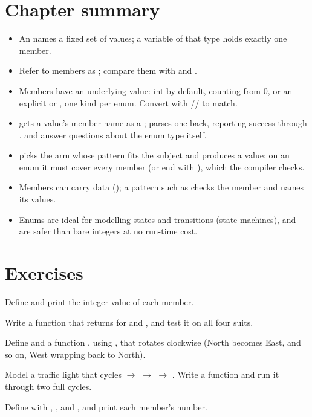 \section{Chapter summary}

\begin{itemize}[leftmargin=1.4em]
  \item An  names a fixed set of values; a variable of that type holds
        exactly one member.
  \item Refer to members as ; compare them with \code{==}
        and \code{!=}.
  \item Members have an underlying value: int by default, counting from 0,
        or an explicit  or , one kind per enum. Convert
        with // to match.
  \item {} gets a value's member name as a ;
         parses one back, reporting success
        through .  and 
        answer questions about the enum type itself.
  \item {} picks the arm whose pattern fits the subject and produces
        a value; on an enum it must cover every member (or end with
        ), which the compiler checks.
  \item Members can carry data (); a pattern such as
         checks the member and names its values.
  \item Enums are ideal for modelling states and transitions (state machines),
        and are safer than bare integers at no run-time cost.
\end{itemize}

\section{Exercises}

\exercise Define  and print
the integer value of each member.

\exercise Write a function  that returns  for
 and , and test it on all four suits.

\exercise Define  and a function
, using , that rotates clockwise (North becomes
East, and so on, West wrapping back to North).

\exercise Model a traffic light that cycles  $\to$  $\to$
 $\to$ . Write a  function and run it through two
full cycles.

\exercise Define  with ,
, and , and print each member's
number.

